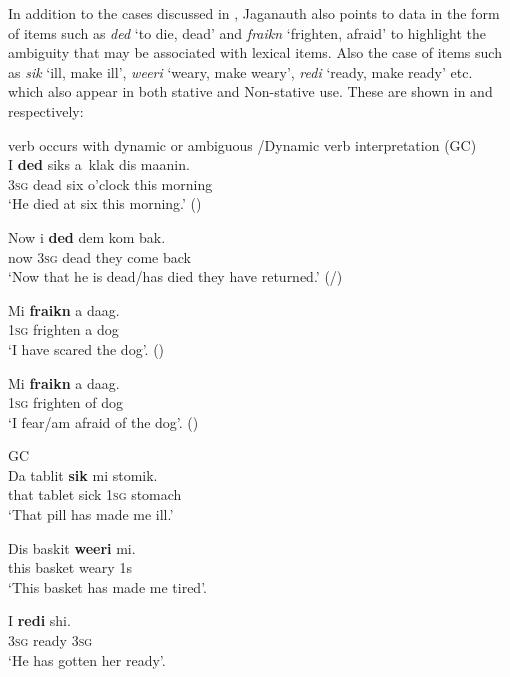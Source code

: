 In addition to the cases discussed in , Jaganauth also
points to data in the form of items such as \textit{ded} `to die,
dead' and \textit{fraikn} `frighten, afraid' to highlight the
ambiguity that may be associated with lexical items. Also the case of
items such as \textit{sik} `ill, make ill', \textit{weeri} `weary,
make weary', \textit{redi} `ready, make ready' etc. which also appear
in both stative and Non-stative use. These are shown in 
and  respectively:

\ea%
\label{ex:2:12}

{ verb occurs with dynamic or ambiguous \slash Dynamic verb interpretation (GC)} \citep[31--32]{Jaganauth1987}\\

\ea
  \gll  I \textbf{ded} siks a~klak     dis maanin.\\
\textsc{3sg} dead    six o’clock   this morning\\
\glt `He died at six this morning.' (\DYNAMIC) 

\ex
\gll Now          i \textbf{ded}     dem    kom    bak.\\
     now \textsc{3sg}       dead    they    come back \\
\glt `Now that he is dead/has died they have returned.'
(\STATIVE/\DYNAMIC) 

\ex
   \gll Mi \textbf{fraikn}  a daag.\\
\textsc{1sg}       frighten  a dog\\
\glt `I have scared the dog'. (\DYNAMIC) 

\ex
    \gll Mi \textbf{fraikn} a daag.\\
\textsc{1sg}        frighten of dog\\
\glt `I fear/am afraid of the dog'. (\STATIVE) \z \z

\ea%
\label{ex:2:13}
GC \citep[31]{Jaganauth1987}\\
\ea
\gll Da tablit \textbf{sik} mi stomik.\\
    that tablet        sick \textsc{1sg} stomach\\
\glt `That pill has made me ill.'

\ex
\gll Dis baskit \textbf{weeri} mi.\\
     this basket        weary 1s\\
\glt `This basket has made me tired'.

\ex
     \gll I \textbf{redi} shi.\\
\textsc{3sg} ready \textsc{3sg}\\
\glt `He has gotten her ready'.  
\z\z


